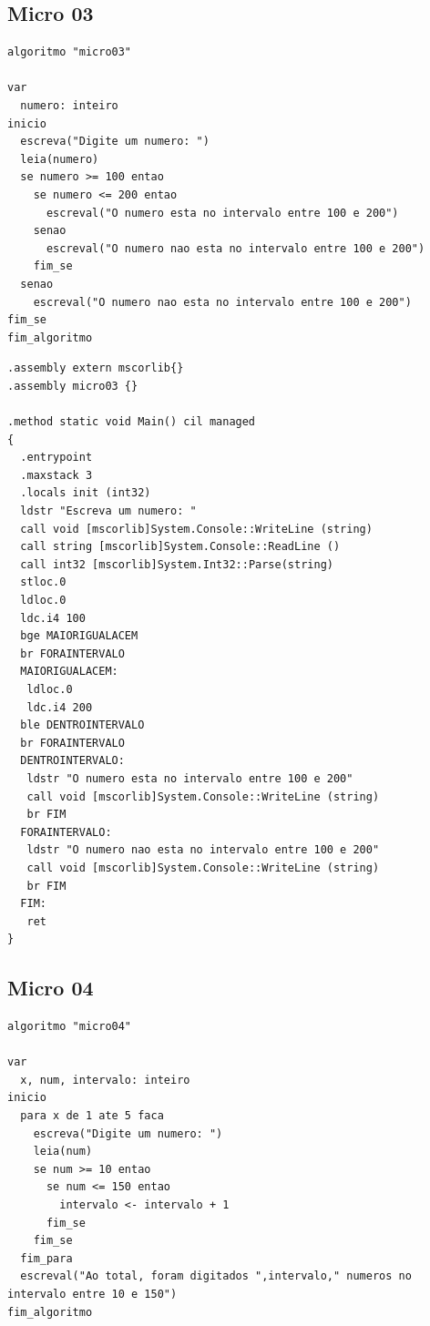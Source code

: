 \documentclass[hidelinks,12pt]{article}
\begin{document}
\subsection{Micro 03}

\begin{lstlisting}[caption=Lê um número e verifica se ele está entre 100 e 200(Portugol)]
algoritmo "micro03"

var
  numero: inteiro
inicio
  escreva("Digite um numero: ")
  leia(numero)
  se numero >= 100 entao
    se numero <= 200 entao
      escreval("O numero esta no intervalo entre 100 e 200")
    senao
      escreval("O numero nao esta no intervalo entre 100 e 200")
    fim_se
  senao 
    escreval("O numero nao esta no intervalo entre 100 e 200")
fim_se
fim_algoritmo
\end{lstlisting}

\begin{lstlisting}[caption=Lê um número e verifica se ele está entre 100 e 200(CIL)]
.assembly extern mscorlib{}
.assembly micro03 {}

.method static void Main() cil managed
{
  .entrypoint
  .maxstack 3
  .locals init (int32)
  ldstr "Escreva um numero: "
  call void [mscorlib]System.Console::WriteLine (string)
  call string [mscorlib]System.Console::ReadLine ()
  call int32 [mscorlib]System.Int32::Parse(string)
  stloc.0
  ldloc.0
  ldc.i4 100
  bge MAIORIGUALACEM
  br FORAINTERVALO
  MAIORIGUALACEM:
   ldloc.0
   ldc.i4 200
  ble DENTROINTERVALO
  br FORAINTERVALO
  DENTROINTERVALO:
   ldstr "O numero esta no intervalo entre 100 e 200"
   call void [mscorlib]System.Console::WriteLine (string)
   br FIM
  FORAINTERVALO:
   ldstr "O numero nao esta no intervalo entre 100 e 200"
   call void [mscorlib]System.Console::WriteLine (string)
   br FIM
  FIM:
   ret
}
\end{lstlisting}

\subsection{Micro 04}

\begin{lstlisting}[caption=Lê números e informa quais estão entre 10 e 150(Portugol)]
algoritmo "micro04"

var
  x, num, intervalo: inteiro
inicio
  para x de 1 ate 5 faca
    escreva("Digite um numero: ")
    leia(num)
    se num >= 10 entao
      se num <= 150 entao
        intervalo <- intervalo + 1
      fim_se
    fim_se
  fim_para
  escreval("Ao total, foram digitados ",intervalo," numeros no
intervalo entre 10 e 150")
fim_algoritmo
\end{lstlisting}
\end{document}
